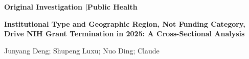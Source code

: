\documentclass[10pt, letterpaper]{article}
\begin{document}
\thispagestyle{firstpage}
\sloppy

{\sffamily\bfseries\fontsize{9}{11}\selectfont
  \textcolor{jamacrimson}{Original Investigation}%
  \textcolor{jamadarkgray}{\enspace|\enspace Public Health}%
}

\vspace{8pt}

{\sffamily\bfseries\fontsize{18}{21}\selectfont\color{jamadarkgray}
Institutional Type and Geographic Region, Not Funding Category, Drive NIH Grant Termination in 2025: A Cross-Sectional Analysis\par}

\vspace{8pt}

{\fontsize{9.5}{11.5}\selectfont\color{jamadarkgray}
Junyang Deng; Shupeng Luxu; Nuo Ding; Claude\par}

\vspace{12pt}


\noindent{\color{jamalightgray}\rule{\textwidth}{0.5pt}}
\vspace{6pt}
\end{document}
